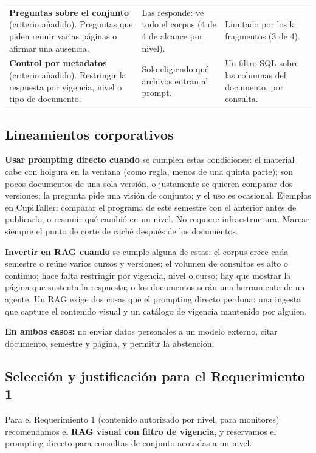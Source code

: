 \documentclass[11pt,letterpaper]{article}
\begin{document}
\begin{table}[H]
\begin{tabularx}{\textwidth}{>{\raggedright\arraybackslash}p{}LL}
\textbf{Preguntas sobre el conjunto} (criterio añadido). Preguntas que piden reunir varias páginas o afirmar una ausencia. & Las responde: ve todo el corpus (4 de 4 de alcance por nivel). & Limitado por los k fragmentos (3 de 4). \\
\textbf{Control por metadatos} (criterio añadido). Restringir la respuesta por vigencia, nivel o tipo de documento. & Solo eligiendo qué archivos entran al prompt. & Un filtro SQL sobre las columnas del documento, por consulta. \\
\bottomrule
\end{tabularx}
\end{table}

\subsection{Lineamientos corporativos}

\textbf{Usar prompting directo cuando} se cumplen estas condiciones: el material cabe con holgura en la ventana (como regla, menos de una quinta parte); son pocos documentos de una sola versión, o justamente se quieren comparar dos versiones; la pregunta pide una visión de conjunto; y el uso es ocasional. Ejemplos en CupiTaller: comparar el programa de este semestre con el anterior antes de publicarlo, o resumir qué cambió en un nivel. No requiere infraestructura. Marcar siempre el punto de corte de caché después de los documentos.

\textbf{Invertir en RAG cuando} se cumple alguna de estas: el corpus crece cada semestre o reúne varios cursos y versiones; el volumen de consultas es alto o continuo; hace falta restringir por vigencia, nivel o curso; hay que mostrar la página que sustenta la respuesta; o los documentos serán una herramienta de un agente. Un RAG exige dos cosas que el prompting directo perdona: una ingesta que capture el contenido visual y un catálogo de vigencia mantenido por alguien.

\textbf{En ambos casos:} no enviar datos personales a un modelo externo, citar documento, semestre y página, y permitir la abstención.

\subsection{Selección y justificación para el Requerimiento 1}

Para el Requerimiento 1 (contenido autorizado por nivel, para monitores) recomendamos el \textbf{RAG visual con filtro de vigencia}, y reservamos el prompting directo para consultas de conjunto acotadas a un nivel.
\end{document}

